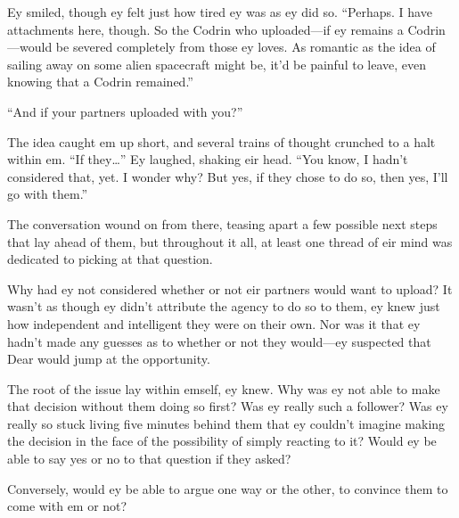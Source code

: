 Ey smiled, though ey felt just how tired ey was as ey did so. ``Perhaps. I have attachments here, though. So the Codrin who uploaded—if ey remains a Codrin—would be severed completely from those ey loves. As romantic as the idea of sailing away on some alien spacecraft might be, it'd be painful to leave, even knowing that a Codrin remained.''

``And if your partners uploaded with you?''

The idea caught em up short, and several trains of thought crunched to a halt within em. ``If they\ldots{}'' Ey laughed, shaking eir head. ``You know, I hadn't considered that, yet. I wonder why? But yes, if they chose to do so, then yes, I'll go with them.''

The conversation wound on from there, teasing apart a few possible next steps that lay ahead of them, but throughout it all, at least one thread of eir mind was dedicated to picking at that question.

Why had ey not considered whether or not eir partners would want to upload? It wasn't as though ey didn't attribute the agency to do so to them, ey knew just how independent and intelligent they were on their own. Nor was it that ey hadn't made any guesses as to whether or not they would—ey suspected that Dear would jump at the opportunity.

The root of the issue lay within emself, ey knew. Why was ey not able to make that decision without them doing so first? Was ey really such a follower? Was ey really so stuck living five minutes behind them that ey couldn't imagine making the decision in the face of the possibility of simply reacting to it? Would ey be able to say yes or no to that question if they asked?

Conversely, would ey be able to argue one way or the other, to convince them to come with em or not?
